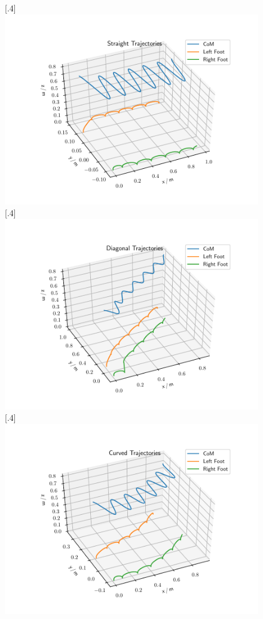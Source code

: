 \begin{figure}[h]
	\centering
	\subcaptionbox{}%
	[.4\linewidth]{\includegraphics[scale=.35]{chapters/05_experiments/01_user_controlled_walking/01_benchmarking/nmpc_straight.pdf}}
	\subcaptionbox{}%
	[.4\linewidth]{\includegraphics[scale=.35]{chapters/05_experiments/01_user_controlled_walking/01_benchmarking/nmpc_diagonal.pdf}}
	\subcaptionbox{}%
	[.4\linewidth]{\includegraphics[scale=.35]{chapters/05_experiments/01_user_controlled_walking/01_benchmarking/nmpc_turn.pdf}}

\end{figure}
